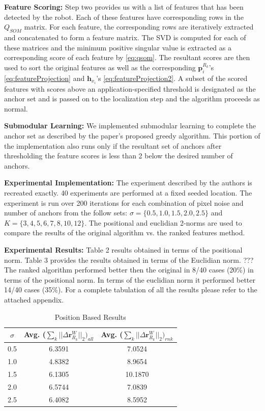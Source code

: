 \documentclass[10pt,twocolumn,letterpaper]{article}
\begin{document}
\textbf{Feature Scoring:} Step two provides us with a list of features that has been detected by the robot. Each of these features have corresponding rows in the $Q_{SOM}$ matrix. For each feature, the corresponding rows are iteratively extracted and concatenated to form a feature matrix. 
The SVD is computed for each of these matrices and the minimum positive singular value is extracted as a
 corresponding score of each feature by \eqref{eq:qsom}. 
 The resultant scores are then used to sort the original features as well 
as the corresponding $\boldsymbol{p}_{i}^{R_k}$'s \eqref{eq:featureProjection} and $\boldsymbol{h}_{x_i}$'s 
\eqref{eq:featureProjection2}. A subset of the scored features with scores above an 
application-specified threshold is designated as the anchor set and is passed on to the localization step and the algorithm proceeds as normal.

\textbf{Submodular Learning:} We implemented submodular learning to complete the anchor set as described by the paper's proposed greedy algorithm. This portion of the implementation also runs only if the resultant set of anchors after thresholding the feature scores is less than 2 below the desired number of anchors.

\textbf{Experimental Implementation:} The experiment described by the authors is recreated exactly. 40 experiments are performed at a fixed seeded location. The experiment is run over 200 iterations for each combination of pixel noise and number of anchors from the follow sets: $\sigma=\{0.5, 1.0, 1.5, 2.0, 2.5\} $ and $ K = \{ 3, 4, 5, 6, 7, 8, 10, 12 \}$. The positional and euclidian 2-norms are used to compare the results of the original algorithm vs. the ranked features method.

\textbf{Experimental Results:} Table 2 results obtained in terms of the positional norm. 
Table 3 provides the results obtained in terms of the Euclidian norm. 
???The ranked algorithm performed better then the original in 8/40 cases (20\%) 
in terms of the positional norm. In terms of the euclidian norm it performed better 14/40 cases (35\%). For a complete tabulation of all the results please refer to the attached appendix.
\begin{table}[h]
\begin{center}
\begin{tabular}{|c|c|c|}
\hline
$\sigma$ & Avg. ($ \sum_k || \Delta \boldsymbol{r}_{R_k}^W ||_2)_{all} $ & Avg. ($ \sum_k || \Delta \boldsymbol{r}_{R_k}^W ||_2)_{rnk} $ \\
\hline
0.5  & 6.3591  &  7.0524\\
\hline
1.0  &  4.8382 &  8.9654\\
\hline
1.5  &  6.1305 &  10.1870\\
\hline
2.0  &  6.5744 &  7.0839\\
\hline
2.5  &  6.4082 &  8.5952\\
\hline
\end{tabular}
\end{center}
\caption{Position Based Results}
\end{table}
\end{document}
